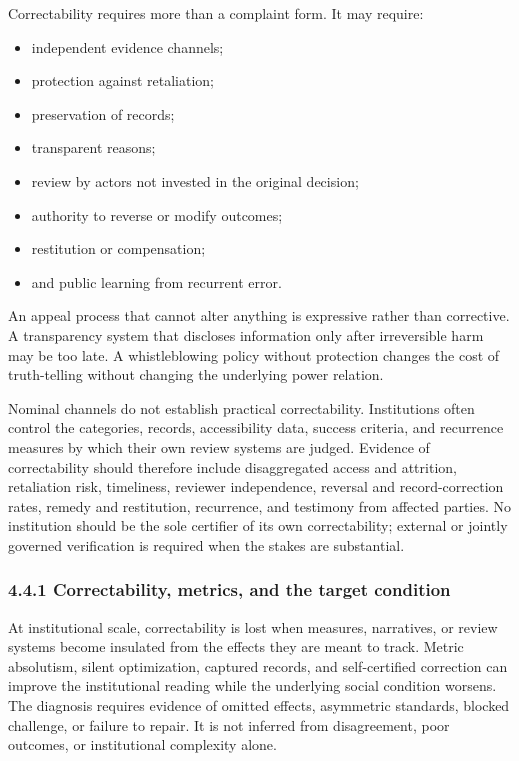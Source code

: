 \documentclass[
  11pt,
]{article}
\providecommand{\tightlist}{%
  \setlength{\itemsep}{0pt}\setlength{\parskip}{0pt}}
\begin{document}
Correctability requires more than a complaint form. It may require:

\begin{itemize}
\tightlist
\item
  independent evidence channels;
\item
  protection against retaliation;
\item
  preservation of records;
\item
  transparent reasons;
\item
  review by actors not invested in the original decision;
\item
  authority to reverse or modify outcomes;
\item
  restitution or compensation;
\item
  and public learning from recurrent error.
\end{itemize}

An appeal process that cannot alter anything is expressive rather than
corrective. A transparency system that discloses information only after
irreversible harm may be too late. A whistleblowing policy without
protection changes the cost of truth-telling without changing the
underlying power relation.

Nominal channels do not establish practical correctability. Institutions
often control the categories, records, accessibility data, success
criteria, and recurrence measures by which their own review systems are
judged. Evidence of correctability should therefore include
disaggregated access and attrition, retaliation risk, timeliness,
reviewer independence, reversal and record-correction rates, remedy and
restitution, recurrence, and testimony from affected parties. No
institution should be the sole certifier of its own correctability;
external or jointly governed verification is required when the stakes
are substantial.

\subsubsection{4.4.1 Correctability, metrics, and the target
condition}\label{correctability-metrics-and-the-target-condition}

At institutional scale, correctability is lost when measures,
narratives, or review systems become insulated from the effects they are
meant to track. Metric absolutism, silent optimization, captured
records, and self-certified correction can improve the institutional
reading while the underlying social condition worsens. The diagnosis
requires evidence of omitted effects, asymmetric standards, blocked
challenge, or failure to repair. It is not inferred from disagreement,
poor outcomes, or institutional complexity alone.
\end{document}
